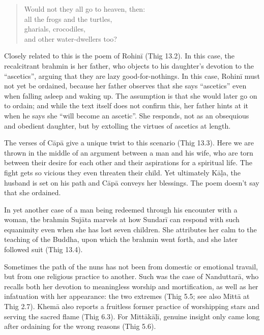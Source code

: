 \documentclass[12pt,openany]{book}%
\begin{document}
\begin{quotation}%
Would not they all go to heaven, then: \\
all the frogs and the turtles, \\
gharials, crocodiles, \\
and other water-dwellers too?

%
\end{quotation}

Closely related to this is the poem of \textsanskrit{Rohinī} (Thig 13.2). In this case, the recalcitrant brahmin is her father, who objects to his daughter’s devotion to the “ascetics”, arguing that they are lazy good-for-nothings. In this case, \textsanskrit{Rohinī} must not yet be ordained, because her father observes that she says “ascetics” even when falling asleep and waking up. The assumption is that she would later go on to ordain; and while the text itself does not confirm this, her father hints at it when he says she “will become an ascetic”. She responds, not as an obsequious and obedient daughter, but by extolling the virtues of ascetics at length.

The verses of \textsanskrit{Cāpā} give a unique twist to this scenario (Thig 13.3). Here we are thrown in the middle of an argument between a man and his wife, who are torn between their desire for each other and their aspirations for a spiritual life. The fight gets so vicious they even threaten their child. Yet ultimately \textsanskrit{Kāḷa}, the husband is set on his path and \textsanskrit{Cāpā} conveys her blessings. The poem doesn’t say that she ordained.

In yet another case of a man being redeemed through his encounter with a woman, the brahmin \textsanskrit{Sujāta} marvels at how \textsanskrit{Sundarī} can respond with such equanimity even when she has lost seven children. She attributes her calm to the teaching of the Buddha, upon which the brahmin went forth, and she later followed suit (Thig 13.4).

Sometimes the path of the nuns has not been from domestic or emotional travail, but from one religious practice to another. Such was the case of \textsanskrit{Nanduttarā}, who recalls both her devotion to meaningless worship and mortification, as well as her infatuation with her appearance: the two extremes (Thig 5.5; see also \textsanskrit{Mittā} at Thig 2.7). \textsanskrit{Khemā} also reports a fruitless former practice of worshipping stars and serving the sacred flame (Thig 6.3). For \textsanskrit{Mittākāḷī}, genuine insight only came long after ordaining for the wrong reasons (Thig 5.6).
\end{document}
